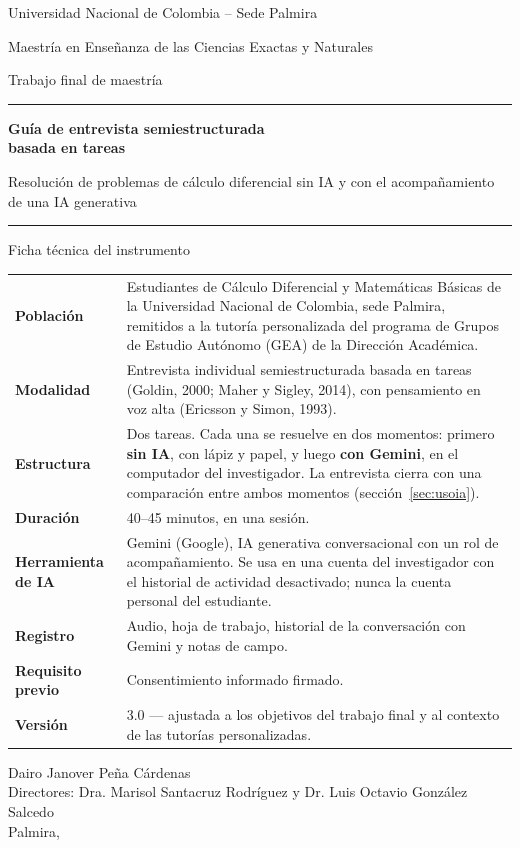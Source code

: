\documentclass[11pt,letterpaper]{article}
\begin{document}
\begin{titlepage}
\centering
{\large Universidad Nacional de Colombia -- Sede Palmira\par}
{\normalsize Maestría en Enseñanza de las Ciencias Exactas y Naturales\par}
{\normalsize Trabajo final de maestría\par}
\vspace{2.2cm}
{\color{unalverde}\rule{\linewidth}{1pt}\par}
\vspace{0.4cm}
{\LARGE\bfseries Guía de entrevista semiestructurada\\[4pt] basada en tareas\par}
\vspace{0.4cm}
{\large Resolución de problemas de cálculo diferencial sin IA y con el acompañamiento de una IA generativa\par}
\vspace{0.4cm}
{\color{unalverde}\rule{\linewidth}{1pt}\par}
\vspace{1.2cm}

\begin{caja}{Ficha técnica del instrumento}
\small
\begin{tabularx}{\linewidth}{@{}>{\bfseries}p{3.6cm}L@{}}
Población & Estudiantes de Cálculo Diferencial y Matemáticas Básicas de la Universidad Nacional de Colombia, sede Palmira, remitidos a la tutoría personalizada del programa de Grupos de Estudio Autónomo (GEA) de la Dirección Académica.\\
Modalidad & Entrevista individual semiestructurada basada en tareas (Goldin, 2000; Maher y Sigley, 2014), con pensamiento en voz alta (Ericsson y Simon, 1993).\\
Estructura & Dos tareas. Cada una se resuelve en dos momentos: primero \textbf{sin IA}, con lápiz y papel, y luego \textbf{con Gemini}, en el computador del investigador. La entrevista cierra con una comparación entre ambos momentos (sección~\ref{sec:usoia}).\\
Duración & 40--45 minutos, en una sesión.\\
Herramienta de IA & Gemini (Google), IA generativa conversacional con un rol de acompañamiento. Se usa en una cuenta del investigador con el historial de actividad desactivado; nunca la cuenta personal del estudiante.\\
Registro & Audio, hoja de trabajo, historial de la conversación con Gemini y notas de campo.\\
Requisito previo & Consentimiento informado firmado.\\
Versión & 3.0 --- ajustada a los objetivos del trabajo final y al contexto de las tutorías personalizadas.
\end{tabularx}
\end{caja}
\vfill
{\small Dairo Janover Peña Cárdenas\\ Directores: Dra. Marisol Santacruz Rodríguez y Dr. Luis Octavio González Salcedo\\[6pt] Palmira, \the\year\par}
\end{titlepage}
\end{document}

